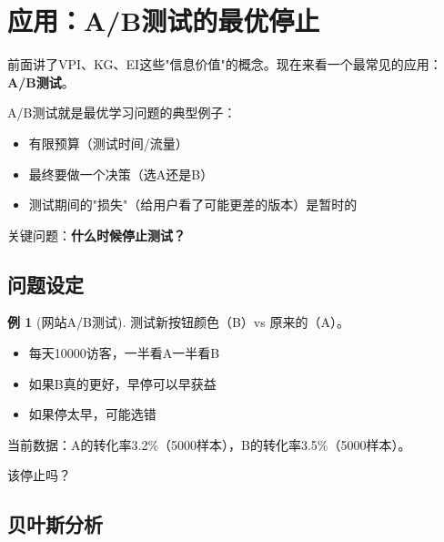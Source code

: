 \documentclass[11pt,a4paper]{article}
\theoremstyle{definition}
\newtheorem{example}{例}[section]
\begin{document}
\section{应用：A/B测试的最优停止}

\begin{plainwords}[把理论用起来]
前面讲了VPI、KG、EI这些"信息价值"的概念。现在来看一个最常见的应用：\textbf{A/B测试}。

A/B测试就是最优学习问题的典型例子：
\begin{itemize}
    \item 有限预算（测试时间/流量）
    \item 最终要做一个决策（选A还是B）
    \item 测试期间的"损失"（给用户看了可能更差的版本）是暂时的
\end{itemize}

关键问题：\textbf{什么时候停止测试？}
\end{plainwords}

\subsection{问题设定}

\begin{example}[网站A/B测试]
测试新按钮颜色（B）vs 原来的（A）。
\begin{itemize}
    \item 每天10000访客，一半看A一半看B
    \item 如果B真的更好，早停可以早获益
    \item 如果停太早，可能选错
\end{itemize}

当前数据：A的转化率3.2\%（5000样本），B的转化率3.5\%（5000样本）。

该停止吗？
\end{example}

\subsection{贝叶斯分析}
\end{document}
